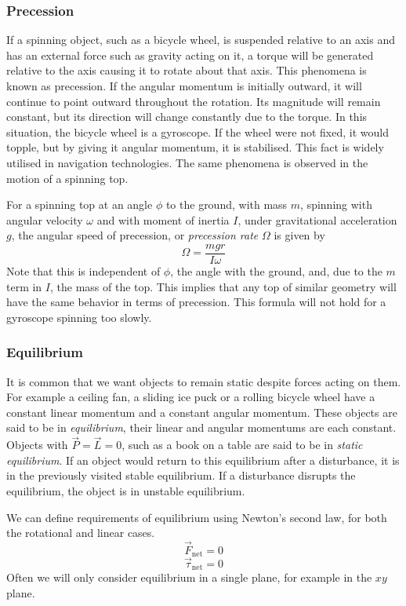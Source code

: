 \documentclass[12pt]{report}
\begin{document}
\begin{flushleft}
\subsubsection*{Precession}
If a spinning object, such as a bicycle wheel, is suspended relative to an axis
and has an external force such as gravity acting on it, a torque will be 
generated relative to the axis causing it to rotate about that axis. This 
phenomena is known as precession. If the angular momentum is initially outward,
it will continue to point outward throughout the rotation. Its magnitude will
remain constant, but its direction will change constantly due to the torque. In
this situation, the bicycle wheel is a gyroscope. If the wheel were not fixed,
it would topple, but by giving it angular momentum, it is stabilised. This 
fact is widely utilised in navigation technologies. The same phenomena is 
observed in the motion of a spinning top.

\bigskip
For a spinning top at an angle \(\phi\) to the ground, with mass \(m\), 
spinning with angular velocity \(\omega\) and with moment of inertia \(I\),
under gravitational acceleration \(g\), the angular speed of precession, or
\textit{precession rate} \(\Omega\) is given by
\[\Omega = \frac{mgr}{I\omega}\]
Note that this is independent of \(\phi\), the angle with the ground, and,
due to the \(m\) term in \(I\), the mass of the top. This implies that any top
of similar geometry will have the same behavior in terms of precession. This 
formula will not hold for a gyroscope spinning too slowly.

\subsubsection*{Equilibrium}
It is common that we want objects to remain static despite forces acting on 
them. For example a ceiling fan, a sliding ice puck or a rolling bicycle wheel
have a constant linear momentum and a constant angular momentum. These objects
are said to be in \textit{equilibrium}, their linear and angular momentums are
each constant. Objects with \(\vec{P} = \vec{L} = 0\), such as a book on a 
table are said to be in \textit{static equilibrium}. If an object would return
to this equilibrium after a disturbance, it is in the previously visited stable
equilibrium. If a disturbance disrupts the equilibrium, the object is in 
unstable equilibrium.

\bigskip
We can define requirements of equilibrium using Newton's second law, for both
the rotational and linear cases.
\[\vec{F}_\mathrm{net} = 0\]
\[\vec{\tau}_\mathrm{net} = 0\]
Often we will only consider equilibrium in a single plane, for example in the
\(xy\) plane.


\end{flushleft}
\end{document}
